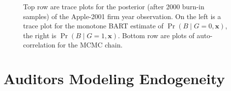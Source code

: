 \documentclass[aoas,preprint, 11pt, dvipsnames, table, x11name]{imsart}
\renewcommand{\bm}[1]{\mathbf{#1}}
\theoremstyle{remark}
\begin{document}
\begin{figure}[!httb]
\caption{Top row are trace plots for the posterior (after 2000 burn-in samples) of the Apple-2001 firm year observation.  On the left is a trace plot for the monotone BART estimate of $\Pr(B\mid G=0, \bm{x})$, the right is $\Pr(B\mid G=1, \bm{x})$.  Bottom row are plots of auto-correlation for the MCMC chain.}

\end{figure}
	
	
	
 \section{Auditors Modeling Endogeneity}\label{section:audit_endo}	
	
	
\end{document}
